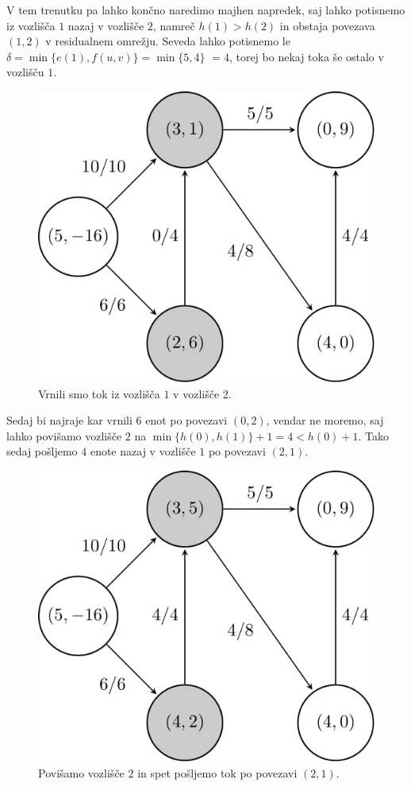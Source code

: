\documentclass[mat1]{fmfdelo}
\begin{document}
V tem trenutku pa lahko končno naredimo majhen napredek, saj lahko potisnemo iz vozlišča $1$ nazaj v vozlišče $2$, namreč $h(1) > h(2)$ in obstaja povezava $(1,2)$ v residualnem
omrežju. Seveda lahko potisnemo le $\delta = \min\{e(1), f(u,v)\} = \min\{5,4\}$ $= 4$, torej bo nekaj toka še ostalo v vozlišču $1$.

\begin{figure}[H]
  \centering
  \includegraphics[scale=.358]{images/graf2-10/graf2-10-1.jpg}
  \caption{Vrnili smo tok iz vozlišča $1$ v vozlišče $2$.}
  \label{fig:slika10}
\end{figure}

Sedaj bi najraje kar vrnili $6$ enot po povezavi $(0,2)$, vendar ne moremo, saj lahko povišamo vozlišče $2$ na $\min\{h(0), h(1)\} + 1 = 4 < h(0) + 1$. Tako sedaj pošljemo
$4$ enote nazaj v vozlišče $1$ po povezavi $(2,1)$.

\begin{figure}[H]
  \centering
  \includegraphics[scale=.358]{images/graf2-11/graf2-11-1.jpg}
  \caption{Povišamo vozlišče $2$ in spet pošljemo tok po povezavi $(2,1)$.}
\end{figure}
\end{document}
